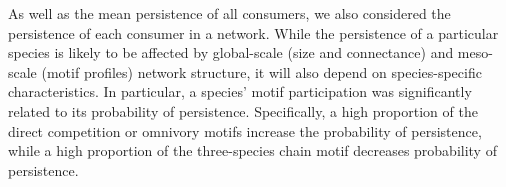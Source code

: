 \documentclass[12pt]{article}
\begin{document}
\begin{spacing}{2.0}
As well as the mean persistence of all consumers, we also considered the persistence of each consumer in a network.
While the persistence of a particular species is likely to be affected by global-scale (size and connectance) and meso-scale (motif profiles) network structure, it will also depend on species-specific characteristics.
In particular, a species' motif participation was significantly related to its probability of persistence.
Specifically, a high proportion of the direct competition or omnivory motifs increase the probability of persistence, while a high proportion of the three-species chain motif decreases probability of persistence.



\end{spacing}
\end{document}
